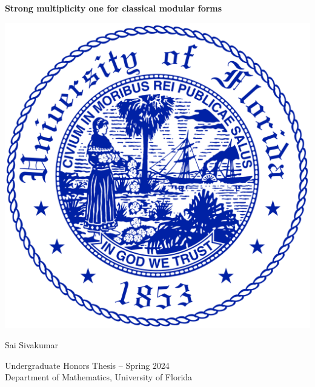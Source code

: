 \documentclass[10pt,leqno]{article}
\theoremstyle{plain}
\theoremstyle{definition}
\numberwithin{equation}{section}
\numberwithin{lem}{section}
\begin{document}
\begin{titlepage}
    \begin{center}
        \vspace*{4em}
        {\Large\textbf{Strong multiplicity one for classical modular forms}}

        \vspace{6em}
        \includegraphics[scale=0.14]{uf.png}

        \vspace{6em}
        Sai Sivakumar

        Undergraduate Honors Thesis -- Spring 2024\\
        Department of Mathematics, University of Florida
    \end{center}
\end{titlepage}
\pagestyle{frontmatter}
\tableofcontents\newpage


\pagestyle{body}

\end{document}
